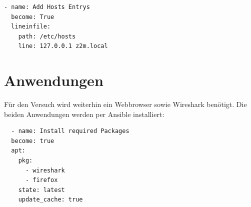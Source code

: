\begin{lstlisting}
- name: Add Hosts Entrys
  become: True
  lineinfile:
    path: /etc/hosts
    line: 127.0.0.1 z2m.local
\end{lstlisting}

\section{Anwendungen}

Für den Versuch wird weiterhin ein Webbrowser sowie Wireshark benötigt. Die beiden Anwendungen werden per Ansible installiert:
\begin{lstlisting}
  - name: Install required Packages
  become: true
  apt:
    pkg:
      - wireshark
      - firefox
    state: latest
    update_cache: true
\end{lstlisting}

